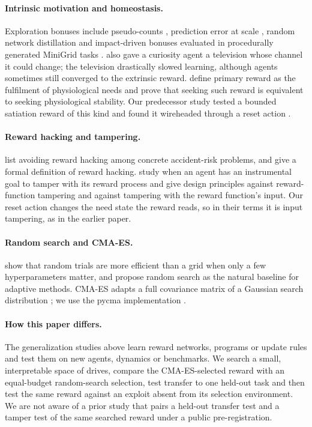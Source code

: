 \documentclass[11pt,letterpaper]{article}
\begin{document}
\paragraph{Intrinsic motivation and homeostasis.} Exploration bonuses include pseudo-counts
\citep{bellemare2016unifying}, prediction error at scale \citep{burda2019largescale}, random network distillation
\citep{burda2019rnd} and impact-driven bonuses evaluated in procedurally generated MiniGrid tasks
\citep{raileanu2020ride}. \citet{burda2019largescale} also gave a curiosity agent a television whose channel it
could change; the television drastically slowed learning, although agents sometimes still converged to the
extrinsic reward. \citet{keramati2014homeostatic} define primary reward as the fulfilment of physiological needs and prove
that seeking such reward is equivalent to seeking physiological stability. Our predecessor study tested a bounded satiation reward of
this kind and found it wireheaded through a reset action \citep{metoyer2026satisfied}.

\paragraph{Reward hacking and tampering.} \citet{amodei2016concrete} list avoiding reward hacking among concrete
accident-risk problems, and \citet{skalse2022defining} give a formal definition of reward hacking. \citet{everitt2021reward}
study when an agent has an instrumental goal to tamper with its reward process and give design principles against
reward-function tampering and against tampering with the reward function's input. Our reset action changes the
need state the reward reads, so in their terms it is input tampering, as in the earlier paper.

\paragraph{Random search and CMA-ES.} \citet{bergstra2012random} show that random trials are more efficient than a
grid when only a few hyperparameters matter, and propose random search as the natural baseline for adaptive
methods. CMA-ES adapts a full covariance matrix of a Gaussian search distribution
\citep{hansen2001completely,hansen2016cma}; we use the pycma implementation \citep{hansen2026pycma}.

\paragraph{How this paper differs.} The generalization studies above learn reward networks, programs or update rules
and test them on new agents, dynamics or benchmarks. We search a small, interpretable space of drives, compare the
CMA-ES-selected reward with an equal-budget random-search selection, test transfer to one held-out task and then test
the same reward against an exploit absent from its selection environment. We are not aware of a prior study that
pairs a held-out transfer test and a tamper test of the same searched reward under a public pre-registration.
\end{document}
